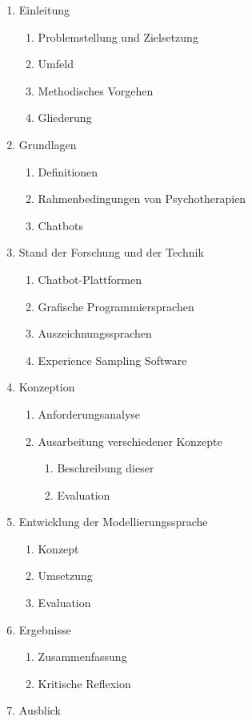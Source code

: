 \begin{enumerate} 
\item Einleitung
	\begin{enumerate}
	\item Problemstellung und Zielsetzung
	\item Umfeld
	\item Methodisches Vorgehen
	\item Gliederung
	\end{enumerate}
\item Grundlagen
	\begin{enumerate}
	\item Definitionen
	\item Rahmenbedingungen von Psychotherapien
	\item Chatbots
	\end{enumerate}
\item Stand der Forschung und der Technik
	\begin{enumerate}
	\item Chatbot-Plattformen
	\item Grafische Programmiersprachen
	\item Auszeichnungssprachen
	\item Experience Sampling Software
	\end{enumerate}
\item Konzeption
	\begin{enumerate}
	\item Anforderungsanalyse
	\item Ausarbeitung verschiedener Konzepte
		\begin{enumerate}
		\item Beschreibung dieser
		\item Evaluation
		\end{enumerate}
	\end{enumerate}
\item Entwicklung der Modellierungssprache
	\begin{enumerate}
	\item Konzept
	\item Umsetzung
	\item Evaluation
	\end{enumerate}

\item Ergebnisse
	\begin{enumerate}
	\item Zusammenfassung
	\item Kritische Reflexion
	\end{enumerate}
\item Ausblick
\end{enumerate}

